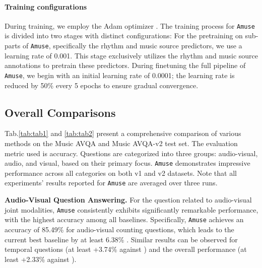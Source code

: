 \documentclass[11pt]{article}
\begin{document}
\paragraph{Training configurations}
During training, we employ the Adam optimizer \cite{kingma2015adam}. The training process for \texttt{Amuse} is divided into two stages with distinct configurations:
For the pretraining on sub-parts of \texttt{Amuse}, specifically the rhythm and music source predictors, we use a learning rate of 0.001. This stage exclusively utilizes the rhythm and music source annotations to pretrain these predictors.
During finetuning the full pipeline of \texttt{Amuse}, we begin with an initial learning rate of 0.0001; the learning rate is reduced by 50\% every 5 epochs to ensure gradual convergence. 

\subsection{Overall Comparisons}
\label{subsec:exp-3}
Tab.\ref{tab:tab1} and \ref{tab:tab2} present a comprehensive comparison of various methods on the Music AVQA and Music AVQA-v2 test set. The evaluation metric used is accuracy. Questions are categorized into three groups: audio-visual, audio, and visual, based on their primary focus. \texttt{Amuse} demonstrates impressive performance across all categories on both v1 and v2 datasets. Note that all experiments' results reported for \texttt{Amuse} are averaged over three runs.

\textbf{Audio-Visual Question Answering.} For the question related to audio-visual joint modalities, \texttt{Amuse} consistently exhibits significantly remarkable performance, with the highest accuracy among all baselines. Specifically, \texttt{Amuse} achieves an accuracy of 85.49\% for audio-visual counting questions, which leads to the current best baseline by at least 6.38\% \cite{liu2023parameter}. Similar results can be observed for temporal questions (at least +3.74\% against \cite{liu2023parameter}) and the overall performance (at least +2.33\% against \cite{liu2023parameter}). 
\end{document}
